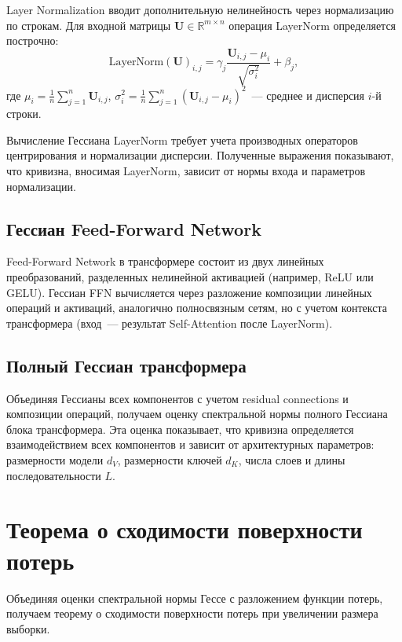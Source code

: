 Layer Normalization вводит дополнительную нелинейность через нормализацию по строкам. Для входной матрицы $\mathbf{U} \in \mathbb{R}^{m \times n}$ операция LayerNorm определяется построчно:
\begin{equation}
\text{LayerNorm}(\mathbf{U})_{i,j} = \gamma_j \frac{\mathbf{U}_{i,j} - \mu_i}{\sqrt{\sigma_i^2}} + \beta_j,
\end{equation}
где $\mu_i = \frac{1}{n} \sum_{j=1}^n \mathbf{U}_{i,j}$, $\sigma_i^2 = \frac{1}{n} \sum_{j=1}^n (\mathbf{U}_{i,j} - \mu_i)^2$~--- среднее и дисперсия $i$-й строки.

Вычисление Гессиана LayerNorm требует учета производных операторов центрирования и нормализации дисперсии. Полученные выражения показывают, что кривизна, вносимая LayerNorm, зависит от нормы входа и параметров нормализации.

\subsection{Гессиан Feed-Forward Network}

Feed-Forward Network в трансформере состоит из двух линейных преобразований, разделенных нелинейной активацией (например, ReLU или GELU). Гессиан FFN вычисляется через разложение композиции линейных операций и активаций, аналогично полносвязным сетям, но с учетом контекста трансформера (вход~--- результат Self-Attention после LayerNorm).

\subsection{Полный Гессиан трансформера}

Объединяя Гессианы всех компонентов с учетом residual connections и композиции операций, получаем оценку спектральной нормы полного Гессиана блока трансформера. Эта оценка показывает, что кривизна определяется взаимодействием всех компонентов и зависит от архитектурных параметров: размерности модели $d_V$, размерности ключей $d_K$, числа слоев и длины последовательности $L$.

\section{Теорема о сходимости поверхности потерь}

Объединяя оценки спектральной нормы Гессе с разложением функции потерь, получаем теорему о сходимости поверхности потерь при увеличении размера выборки.

